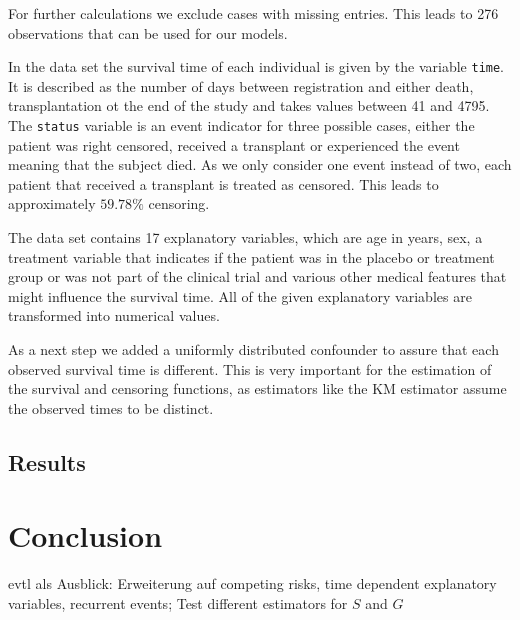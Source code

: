 \documentclass[12pt, a4paper]{scrartcl}
\theoremstyle{definition}
\theoremstyle{plain}
\numberwithin{equation}{section}
\numberwithin{figure}{section}
\numberwithin{table}{section}
\begin{document}
	For further calculations we exclude cases with missing entries.
	This leads to 276 observations that can be used for our models.
	
	In the data set the survival time of each individual is given by the variable \texttt{time}.
	It is described as the number of days between registration and either death, transplantation ot the end of the study and takes values between 41 and 4795.
	The \texttt{status} variable is an event indicator for three possible cases, either the patient was right censored, received a transplant or experienced the event meaning that the subject died.
	As we only consider one event instead of two, each patient that received a transplant is treated as censored.
	This leads to approximately $59.78\%$ censoring.
	
	The data set contains 17 explanatory variables, which are age in years, sex, a treatment variable that indicates if the patient was in the placebo or treatment group or was not part of the clinical trial and various other medical features that might influence the survival time.
	All of the given explanatory variables are transformed into numerical values.
	
	As a next step we added a uniformly distributed confounder to assure that each observed survival time is different.
	This is very important for the estimation of the survival and censoring functions, as estimators like the KM estimator assume the observed times to be distinct. 
	\subsection{Results}
	
	\newpage
	\section{Conclusion}
	
	evtl als Ausblick: Erweiterung auf competing risks, time dependent explanatory variables, recurrent events; Test different estimators for $S$ and $G$
	
	\newpage
	
	\thispagestyle{empty}
	
	
	
	\newpage
	
\end{document}
